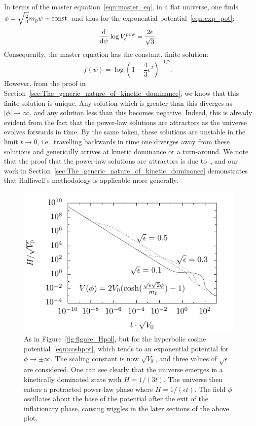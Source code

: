 In terms of the master equation~\eqref{eqn:master_eq}, in a flat universe, one finds \(\phi = \sqrt{\frac{2}{3}}m_{\mathrm{p}} \psi + \mathrm{const.} \) and thus for the exponential potential~\eqref{eqn:exp_pot}:
\begin{equation}
  \frac{\operatorname{d}^{}\!{}}{\operatorname{d}^{}\!{\psi}} \log V^\mathrm{pow}_\epsilon = \frac{2\epsilon}{\sqrt{3}}. 
\end{equation}
Consequently, the master equation has the constant, finite solution:
\begin{equation}
  f(\psi) = \log{\left(1-\frac{4}{3}\epsilon^2\right)}^{-1/2}.
  \label{eqn:uf_power_law}
\end{equation}
However, from the proof in Section~\ref{sec:The_generic_nature_of_kinetic_dominance}, we know that this finite solution is unique. Any solution which is greater than this diverges as \(|\phi|\to\infty\), and any solution less than this becomes negative.  Indeed, this is already evident from the fact that the power-law solutions are attractors as the universe evolves forwards in time. By the same token, these solutions are unstable in the limit \(t \to 0\), i.e.\ travelling backwards in time one diverges away from these solutions and generically arrives at kinetic dominance or a turn-around.  We note that the proof that the power-law solutions are attractors is due to~\cite{halliwell_scalar_1987}, and our work in Section~\ref{sec:The_generic_nature_of_kinetic_dominance} demonstrates that Halliwell's methodology is applicable more generally.

\begin{figure}[tp]
  \includegraphics[width=\textwidth]{chapters/kinetic_dominance/figures/Hlam}
  \caption{As in Figure~\protect\ref{fig:figure_Hpol}, but for the hyperbolic cosine potential~\protect\eqref{eqn:coshpot}, which tends to an exponential potential for \(\phi \to \pm\infty\). The scaling constant is now \(\sqrt{V_0}\), and three values of \(\sqrt{\epsilon}\) are considered. One can see clearly that the universe emerges in a kinetically dominated state with \(H=1/(3t)\). The universe then enters a protracted power-law phase where \(H = 1/(\epsilon t)\). The field \(\phi\) oscillates about the base of the potential after the exit of the inflationary phase, causing wiggles in the later sections of the above plot.}\label{fig:figure_Hlam}
\end{figure}


